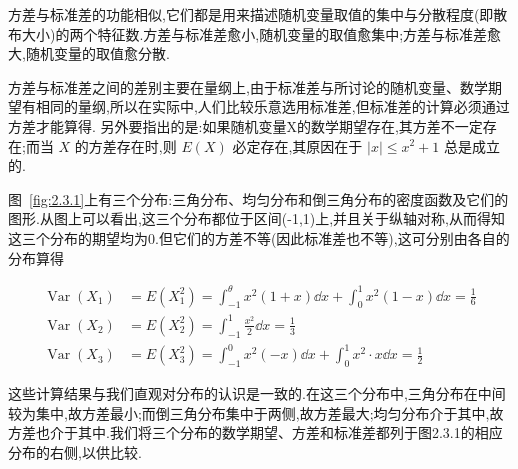 方差与标准差的功能相似,它们都是用来描述随机变量取值的集中与分散程度(即散布大小)的两个特征数.方差与标准差愈小,随机变量的取值愈集中;方差与标准差愈大,随机变量的取值愈分散.

方差与标准差之间的差别主要在量纲上,由于标准差与所讨论的随机变量、数学期望有相同的量纲,所以在实际中,人们比较乐意选用标准差,但标准差的计算必须通过方差才能算得.
另外要指出的是:如果随机变量X的数学期望存在,其方差不一定存在;而当 $ X $ 的方差存在时,则 $ E(X) $ 必定存在,其原因在于 $ |x| \leqslant x^{2}+1 $ 总是成立的.

\begin{example}\label{exam:2.3.1}
	图~\ref{fig:2.3.1}上有三个分布:三角分布、均匀分布和倒三角分布的密度函数及它们的图形.从图上可以看出,这三个分布都位于区间(-1,1)上,并且关于纵轴对称,从而得知这三个分布的期望均为0.但它们的方差不等(因此标准差也不等),这可分别由各自的分布算得
	
	\[
	\begin{aligned}
	\operatorname{Var}\left(X_{1}\right)&=E\left(X_{1}^{2}\right)=\int_{-1}^{\theta} x^{2}(1+x) \dd x+\int_{0}^{1} x^{2}(1-x) \dd x=\frac{1}{6}\\
	\operatorname{Var}\left(X_{2}\right) &=E\left(X_{2}^{2}\right)=\int_{-1}^{1} \frac{x^{2}}{2} \dd x=\frac{1}{3} \\ 
	\operatorname{Var}\left(X_{3}\right) &=E\left(X_{3}^{2}\right)=\int_{-1}^{0} x^{2}(-x) \dd x+\int_{0}^{1} x^{2} \cdot x \dd x=\frac{1}{2} 
	\end{aligned}
	\]
	
	这些计算结果与我们直观对分布的认识是一致的.在这三个分布中,三角分布在中间较为集中,故方差最小;而倒三角分布集中于两侧,故方差最大;均匀分布介于其中,故方差也介于其中.我们将三个分布的数学期望、方差和标准差都列于图2.3.1的相应分布的右侧,以供比较.
	
\end{example}


